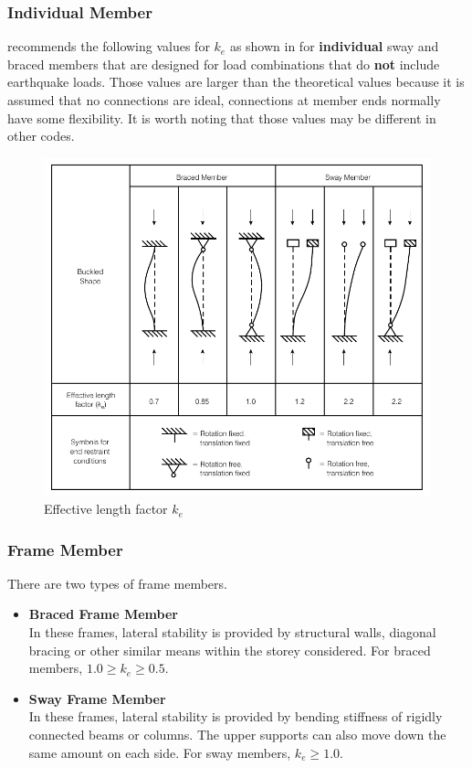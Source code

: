 \subsubsection{Individual Member}
 recommends the following values for $k_e$ as shown in  for \textbf{individual} sway and braced members that are designed for load combinations that do \textbf{not} include earthquake loads. Those values are larger than the theoretical values because it is assumed that no connections are ideal, connections at member ends normally have some flexibility. It is worth noting that those values may be different in other codes.
\begin{figure}[H]\centering
\includegraphics{PIC/CH04/BS}
\caption{Effective length factor $k_e$}\label{fig:k_e}
\end{figure}
\subsubsection{Frame Member}
There are two types of frame members.
\begin{itemize}
\item \textbf{Braced Frame Member}\\
In these frames, lateral stability is provided by structural walls, diagonal bracing or other similar means within the storey considered. For braced members, $1.0\geqslant{}k_e\geqslant{}0.5$.
\item \textbf{Sway Frame Member}\\
In these frames, lateral stability is provided by bending stiffness of rigidly connected beams or columns. The upper supports can also move down the same amount on each side. For sway members, $k_e\geqslant{}1.0$.
\end{itemize}

